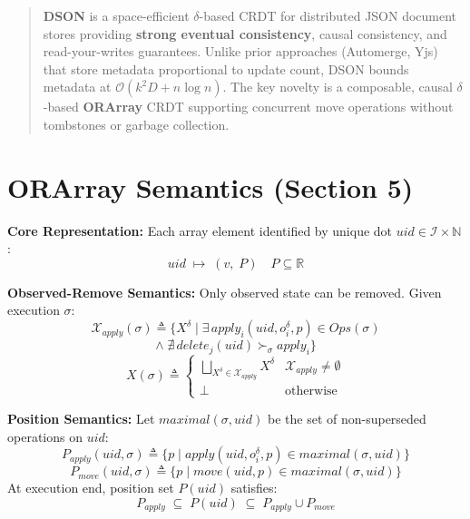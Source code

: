 \documentclass[a0,portrait]{a0poster}
\begin{document}
\begin{multicols}{3}


\color{Navy}

\begin{abstract}
\textbf{DSON} is a space-efficient $\delta$-based CRDT for distributed JSON document stores providing \textbf{strong eventual consistency}, causal consistency, and read-your-writes guarantees. Unlike prior approaches (Automerge, Yjs) that store metadata proportional to update count, DSON bounds metadata at $\mathcal{O}(k^2D + n\log n)$. The key novelty is a composable, causal $\delta$-based \textbf{ORArray} CRDT supporting concurrent move operations without tombstones or garbage collection.
\end{abstract}


\color{Black}
\section*{ORArray Semantics (Section 5)}

\textbf{Core Representation:} Each array element identified by unique dot $uid \in \mathcal{I} \times \mathbb{N}$:
\[
uid \;\mapsto\; (v,\; P) \quad P \subseteq \mathbb{R}
\]

\textbf{Observed-Remove Semantics:} Only observed state can be removed. Given execution $\sigma$:
\[
\mathcal{X}_{apply}(\sigma) \triangleq \big\{X^\delta \mid \exists\,apply_i(uid,o^\delta_i,p)\in Ops(\sigma)
\]
\[
\wedge\;\nexists\,delete_j(uid)\succ_\sigma apply_i\big\}
\]
\[
X(\sigma) \triangleq \begin{cases} \bigsqcup_{X^\delta \in \mathcal{X}_{apply}} X^\delta & \mathcal{X}_{apply} \neq \emptyset \\ \bot & \text{otherwise} \end{cases}
\]

\textbf{Position Semantics:} Let $maximal(\sigma,uid)$ be the set of non-superseded operations on $uid$:
\[
P_{apply}(uid,\sigma) \triangleq \{p \mid apply(uid,o^\delta_i,p) \in maximal(\sigma,uid)\}
\]
\[
P_{move}(uid,\sigma) \triangleq \{p \mid move(uid,p) \in maximal(\sigma,uid)\}
\]
At execution end, position set $P(uid)$ satisfies:
\[
P_{apply} \;\subseteq\; P(uid) \;\subseteq\; P_{apply} \cup P_{move}
\]


\end{multicols}
\end{document}
